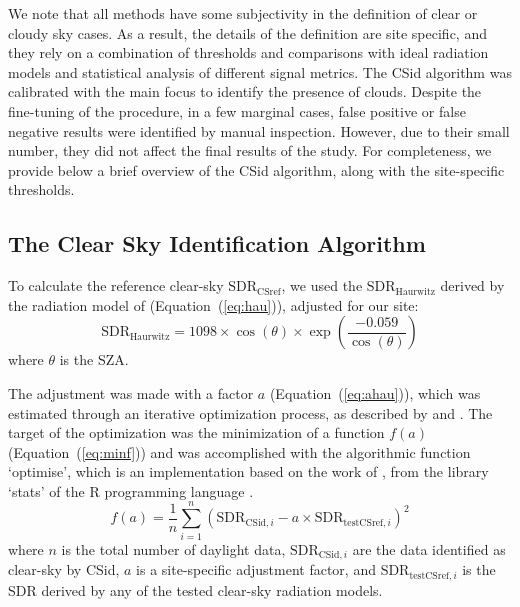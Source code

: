\documentclass[applsci,article,submit,moreauthors,pdftex]{Definitions/mdpi}
\begin{document}
We note that all methods have some subjectivity in the definition of
clear or cloudy sky cases. As a result, the details of the definition
are site specific, and they rely on a combination of thresholds and
comparisons with ideal radiation models and statistical analysis of
different signal metrics. The CSid algorithm was calibrated with the
main focus to identify the presence of clouds. Despite the fine-tuning
of the procedure, in a few marginal cases, false positive or false
negative results were identified by manual inspection. However, due to
their small number, they did not affect the final results of the study.
For completeness, we provide below a brief overview of the CSid
algorithm, along with the site-specific thresholds.

\hypertarget{CDIDalgorithm}{%
\subsection{The Clear Sky Identification
Algorithm}\label{CDIDalgorithm}}

To calculate the reference clear-sky \(\text{SDR}_\text{CSref}\), we
used the \(\text{SDR}_\text{Haurwitz}\) derived by the radiation model
of \citet{Haurwitz1945} (Equation~(\ref{eq:hau})), adjusted for our
site: \begin{equation}
\text{SDR}_\text{Haurwitz} = 1098 \times \cos(\theta) \times \exp \left( \frac{ - 0.059}{\cos(\theta)} \right) \label{eq:hau}
\end{equation} where \(\theta\) is the SZA.

The adjustment was made with a factor \(a\) (Equation~(\ref{eq:ahau})),
which was estimated through an iterative optimization process, as
described by \citet{Long2000} and \citet{Reno2016}. The target of the
optimization was the minimization of a function \(f(a)\)
(Equation~(\ref{eq:minf})) and was accomplished with the algorithmic
function `optimise', which is an implementation based on the work of
\citet{Brent1973}, from the library `stats' of the R programming
language \citep{RCT2023}. \begin{equation}
f(a) = \frac{1}{n}\sum_{i=1}^{n} ( \text{SDR}_{\text{CSid},i} - a \times \text{SDR}_{\text{testCSref},i} )^2 \label{eq:minf}
\end{equation} where \(n\) is the total number of daylight data,
\(\text{SDR}_{\text{CSid},i}\) are the data identified as clear-sky by
CSid, \(a\) is a site-specific adjustment factor, and
\(\text{SDR}_{\text{testCSref},i}\) is the SDR derived by any of the
tested clear-sky radiation models.
\end{document}
